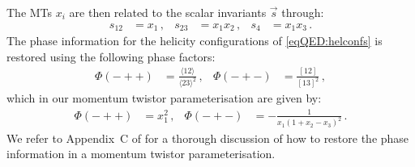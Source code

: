 \documentclass[main.tex]{subfiles}
\begin{document}
The MTs $x_i$ are then related to the scalar invariants $\vec{s}$ through:
\begin{align} \label{eqQED:mtvs}
    s_{12} &= x_1 \,, &
    s_{23} &= x_1 x_2 \,, &
    s_4 &= x_1 x_3 \,.
\end{align}
The phase information for the helicity configurations of \cref{eqQED:helconfs} is restored using the following phase factors: 
\begin{align}
  \Phi(-++) &= \frac{\langle 1 2 \rangle}{\langle 2 3 \rangle^2} \,,&
  \Phi(-+-) &= \frac{[ 1 2 ]}{[ 1 3 ]^2} \,,
\end{align}
which in our momentum twistor parameterisation are given by:
\begin{align}
  \Phi(-++) &= x_1^2 \,,&
  \Phi(-+-) &= - \frac{1}{x_1 (1 + x_2 - x_3)^2}   \,.
\end{align}
We refer to Appendix~C of  for a thorough discussion of how to restore the phase information in a momentum twistor parameterisation.
  
\end{document}
